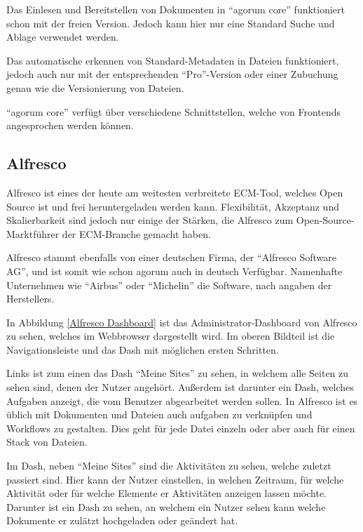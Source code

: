 Das Einlesen und Bereitstellen von Dokumenten in "`agorum core"' funktioniert schon mit der freien Version. Jedoch kann hier nur eine Standard Suche und Ablage verwendet werden. \cite{agorum_preise}

Das automatische erkennen von Standard-Metadaten in Dateien funktioniert, jedoch auch nur mit der entsprechenden "`Pro"'-Version oder einer Zubuchung genau wie die Versionierung von Dateien.

"`agorum core"' verf\"ugt \"uber verschiedene Schnittstellen, welche von Frontends angesprochen werden k\"onnen. 

\subsection{Alfresco} \label{Alfresco}
Alfresco ist eines der heute am weitesten verbreitete \ac{ECM}-Tool, welches Open Source ist und frei heruntergeladen werden kann.
Flexibilit\"at, Akzeptanz und Skalierbarkeit sind jedoch nur einige der St\"arken, die Alfresco zum Open-Source-Marktf\"uhrer der \ac{ECM}-Branche gemacht haben. \cite{Alfresco_und_Liferay} \cite{Wiki_Alfresco} \cite{Alfresco_Implementation}

Alfresco stammt ebenfalls von einer deutschen Firma, der "`Alfresco Software AG"', und ist somit wie schon agorum auch in deutsch Verf\"ugbar. Namenhafte Unternehmen wie "`Airbus"' oder "`Michelin"' die Software, nach angaben der Herstellers. \cite{Alfresco_Website}

In Abbildung \ref{Alfresco Dashboard} ist das Administrator-Dashboard von Alfresco zu sehen, welches im Webbrowser dargestellt wird.
Im oberen Bildteil ist die Navigationsleiste und das Dash mit m\"oglichen ersten Schritten.

Links ist zum einen das Dash "`Meine Sites"' zu sehen, in welchem alle Seiten zu sehen sind, denen der Nutzer angeh\"ort. Au\ss{}erdem ist darunter ein Dash, welches Aufgaben anzeigt, die vom Benutzer abgearbeitet werden sollen. In Alfresco ist es \"ublich mit Dokumenten und Dateien auch aufgaben zu verkn\"upfen und Workflows zu gestalten. Dies geht f\"ur jede Datei einzeln oder aber auch f\"ur einen Stack von Dateien.

Im Dash, neben "`Meine Sites"' sind die Aktivit\"aten zu sehen, welche zuletzt passiert sind. Hier kann der Nutzer einstellen, in welchen Zeitraum, f\"ur welche Aktivit\"at oder f\"ur welche Elemente er Aktivit\"aten anzeigen lassen m\"ochte.
Darunter ist ein Dash zu sehen, an welchem ein Nutzer sehen kann welche Dokumente er zul\"atzt hochgeladen oder ge\"andert hat.

